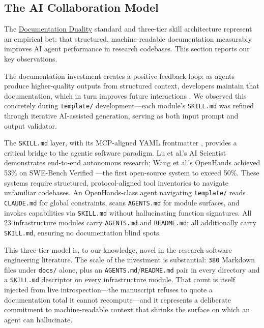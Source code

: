 \documentclass[
]{article}
\begin{document}
\newpage

\subsection{The AI Collaboration
Model}\label{the-ai-collaboration-model}

The
\href{03c_documentation.md\#documentation-duality-and-ai-collaboration}{Documentation
Duality} standard and three-tier skill architecture represent an
empirical bet: that structured, machine-readable documentation
measurably improves AI agent performance in research codebases. This
section reports our key observations.

The documentation investment creates a positive feedback loop: as agents
produce higher-quality outputs from structured context, developers
maintain that documentation, which in turn improves future interactions
\citep{lau2025aicoding}. We observed this concretely during
\texttt{template/} development---each module's \texttt{SKILL.md} was
refined through iterative AI-assisted generation, serving as both input
prompt and output validator.

The \texttt{SKILL.md} layer, with its MCP-aligned YAML frontmatter
\citep{anthropic2024mcp}, provides a critical bridge to the agentic
software paradigm. Lu et al.'s AI Scientist \citep{lu2024aiscientist}
demonstrates end-to-end autonomous research; Wang et al.'s OpenHands
\citep{wang2024opendevin} achieved 53\% on SWE-Bench Verified
\citep{jimenez2024swebench}---the first open-source system to exceed
50\%. These systems require structured, protocol-aligned tool
inventories to navigate unfamiliar codebases. An OpenHands-class agent
navigating \texttt{template/} reads \texttt{CLAUDE.md} for global
constraints, scans \texttt{AGENTS.md} for module surfaces, and invokes
capabilities via \texttt{SKILL.md} without hallucinating function
signatures. All 23 infrastructure modules carry \texttt{AGENTS.md} and
\texttt{README.md}; all additionally carry \texttt{SKILL.md}, ensuring
no documentation blind spots.

This three-tier model is, to our knowledge, novel in the research
software engineering literature. The scale of the investment is
substantial: \texttt{380} Markdown files under \texttt{docs/} alone,
plus an \texttt{AGENTS.md}/\texttt{README.md} pair in every directory
and a \texttt{SKILL.md} descriptor on every infrastructure module. That
count is itself injected from live introspection---the manuscript
refuses to quote a documentation total it cannot recompute---and it
represents a deliberate commitment to machine-readable context that
shrinks the surface on which an agent can hallucinate.
\end{document}
